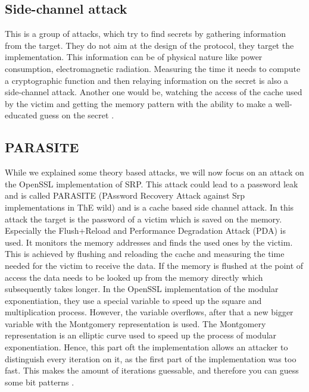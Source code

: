 \documentclass[journal]{IEEEtran}
\begin{document}
\subsection{Side-channel attack}
This is a group of attacks, which try to find secrets by gathering information from the target. They do not aim at the design of the protocol, they target the implementation. 
This information can be of physical nature like power consumption, electromagnetic radiation. Measuring the time it needs to compute a cryptographic function and then relaying information on the secret is also a side-channel attack.
Another one would be, watching the access of the cache used by the victim and getting the memory pattern with the ability to make a well-educated guess on the secret \cite{standaert2010introduction}. 

\subsection{PARASITE}
While we explained some theory based attacks, we will now focus on an attack on the OpenSSL implementation of SRP.
This attack could lead to a password leak and is called PARASITE (PAssword Recovery Attack against Srp implementations in ThE wild) and is a cache based side channel attack. 
In this attack the target is the password of a victim which is saved on the memory. Especially the Flush+Reload and Performance Degradation Attack (PDA) is used. \cite{de2021parasite}
It monitors the memory addresses and finds the used ones by the victim. This is achieved by flushing and reloading the cache and measuring the time needed for the victim to receive the data.
If the memory is flushed at the point of access the data needs to be looked up from the memory directly which subsequently takes longer.
In the OpenSSL implementation of the modular exponentiation, they use a special variable to speed up the square and multiplication process. However, the variable overflows, after that a new bigger variable with the Montgomery representation is used.
The Montgomery representation is an elliptic curve used to speed up the process of modular exponentiation.
Hence, this part oft the implementation allows an attacker to distinguish every iteration on it, as the first part of the implementation was too fast. 
This makes the amount of iterations guessable, and therefore you can guess some bit patterns \cite{standaert2010introduction}. 
\end{document}
